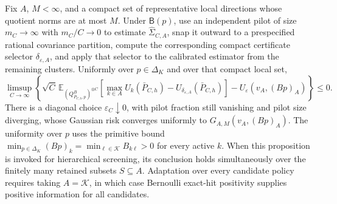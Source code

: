 Fix \(A\), \(M<\infty\), and a compact set of representative local directions whose quotient norms are at most \(M\).  Under \(\mathsf B(p)\), use an independent pilot of size \(m_C\to\infty\) with \(m_C/C\to0\) to estimate \(\widehat\Sigma_{C,A}\), snap it outward to a prespecified rational covariance partition, compute the corresponding compact certificate selector \(\delta_{\varepsilon,A}\), and apply that selector to the calibrated estimator from the remaining clusters.  Uniformly over \(p\in\Delta_K\) and over that compact local set,
\[
\limsup_{C\to\infty}\left\{\sqrt C\,\mathbb E_{(Q^B_{\bar P_{C,h},p})^{\otimes C}}
\left[\max_{k\in A}U_k(\bar P_{C,h})-U_{\delta_{\varepsilon,A}}(\bar P_{C,h})\right]
-U_\varepsilon(v_A,(Bp)_A)\right\}\leq0.
\]
There is a diagonal choice \(\varepsilon_C\downarrow0\), with pilot fraction still vanishing and pilot size diverging, whose Gaussian risk converges uniformly to \(G_{A,M}(v_A,(Bp)_A)\).  The uniformity over \(p\) uses the primitive bound \(\min_{p\in\Delta_K}(Bp)_k=\min_{\ell\in\mathcal K}B_{k\ell}>0\) for every active \(k\).  When this proposition is invoked for hierarchical screening, its conclusion holds simultaneously over the finitely many retained subsets \(S\subseteq A\).  Adaptation over every candidate policy requires taking \(A=\mathcal K\), in which case Bernoulli exact-hit positivity supplies positive information for all candidates.